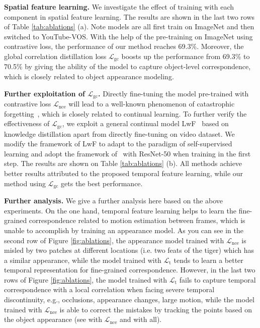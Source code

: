 \documentclass{article}
\begin{document}
\textbf{Spatial feature learning.} We investigate the effect of training with each component in spatial feature learning. The results are shown in the last two rows of Table \ref{tab:ablations} (a). Note models are all first train on ImageNet and then switched to YouTube-VOS. With the help of the pre-training on ImageNet using contrastive loss, the performance of our method reaches 69.3\%. Moreover, the global correlation distillation loss $\mathcal{L}_{\mathrm{gc}}$ boosts up the performance from 69.3\% to 70.5\% by giving the ability of the model to capture object-level correspondence, which is closely related to object appearance modeling.
 
\textbf{Further exploitation of $\mathcal{L}_{\mathrm{gc}}$.}  Directly fine-tuning the model pre-trained with contrastive loss $\mathcal{L}_{\mathrm{nce}}$ will lead to a well-known phenomenon of catastrophic forgetting~\cite{li2017learning}, which is closely related to continual learning. To further verify the effectiveness of  $\mathcal{L}_{\mathrm{gc}}$, we exploit a general continual model LwF~\cite{li2017learning}  based on knowledge distillation apart from directly fine-tuning on video dataset. We modify the framework of LwF to adapt to the paradigm of self-supervised learning and adopt the framework of~\cite{xie2021detco} with ResNet-50 when training in the first step. The results are shown on Table \ref{tab:ablations} (b). All methods achieve better results attributed to the proposed temporal feature learning, while our method using $\mathcal{L}_{\mathrm{gc}}$ gets the best performance. 

\textbf{Further analysis.} 
We give a further analysis here based on the above experiments. On the one hand, temporal feature learning helps to learn the fine-grained correspondence related to motion estimation between frames, which is unable to accomplish by training an appearance model. As you can see in the second row of Figure \ref{fig:ablations}, the appearance model trained with $\mathcal{L}_{\mathrm{nce}}$ is misled by two patches at different locations (i.e. two feats of the tiger) which has a similar appearance, while the model trained with $\mathcal{L}_{\mathrm{t}}$ tends to learn a better temporal representation for fine-grained correspondence. However, in the last two rows of Figure \ref{fig:ablations}, the model trained with $\mathcal{L}_{\mathrm{t}}$ fails to capture temporal correspondence with a local correlation when facing severe temporal discontinuity, e.g., occlusions, appearance changes, large motion,  while the model trained with $\mathcal{L}_{\mathrm{nce}}$ is able to correct the mistakes by tracking the points based on the object appearance (see with $\mathcal{L}_{\mathrm{nce}}$ and with all).
\end{document}
